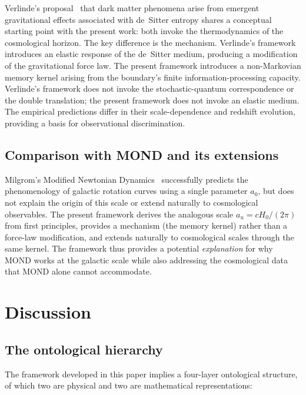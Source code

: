 \documentclass[aps,prd,twocolumn,superscriptaddress,nofootinbib]{revtex4-2}
\begin{document}
Verlinde's proposal~\cite{Verlinde2017} that dark matter phenomena arise from emergent gravitational effects associated with de~Sitter entropy shares a conceptual starting point with the present work: both invoke the thermodynamics of the cosmological horizon. The key difference is the mechanism. Verlinde's framework introduces an elastic response of the de~Sitter medium, producing a modification of the gravitational force law. The present framework introduces a non-Markovian memory kernel arising from the boundary's finite information-processing capacity. Verlinde's framework does not invoke the stochastic-quantum correspondence or the double translation; the present framework does not invoke an elastic medium. The empirical predictions differ in their scale-dependence and redshift evolution, providing a basis for observational discrimination.

\subsection{Comparison with MOND and its extensions}

Milgrom's Modified Newtonian Dynamics~\cite{Milgrom1983} successfully predicts the phenomenology of galactic rotation curves using a single parameter $a_0$, but does not explain the origin of this scale or extend naturally to cosmological observables. The present framework derives the analogous scale $a_u = cH_0/(2\pi)$ from first principles, provides a mechanism (the memory kernel) rather than a force-law modification, and extends naturally to cosmological scales through the same kernel. The framework thus provides a potential \emph{explanation} for why MOND works at the galactic scale while also addressing the cosmological data that MOND alone cannot accommodate.


\section{Discussion}
\label{sec:discussion}

\subsection{The ontological hierarchy}

The framework developed in this paper implies a four-layer ontological structure, of which two are physical and two are mathematical representations:
\end{document}
